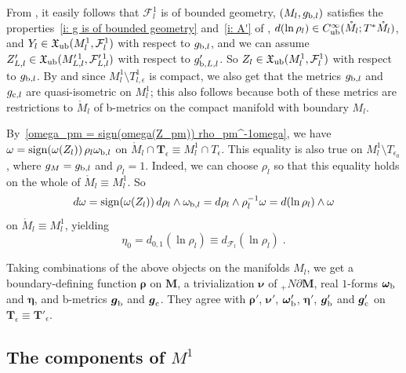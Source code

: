 \documentclass{memo-l}
\theoremstyle{plain}
\theoremstyle{definition}
\theoremstyle{remark}
\newcommand{\FF}{\mathcal{F}}
\newcommand{\fX}{\mathfrak{X}}
\newcommand{\bfg}{\boldsymbol{g}}
\newcommand{\bfM}{\boldsymbol{M}}
\newcommand{\bfT}{\boldsymbol{T}}
\newcommand{\bfnu}{\boldsymbol{\nu}}
\newcommand{\bfrho}{\boldsymbol{\rho}}
\newcommand{\bfeta}{\boldsymbol{\eta}}
\newcommand{\bfomega}{\boldsymbol{\omega}}
\newcommand{\sign}{\operatorname{sign}}
\newcommand{\co}{{\text{\rm c}}}
\newcommand{\fXub}{\fX_{\text{\rm ub}}}
\numberwithin{section}{chapter}
\numberwithin{equation}{section}%
\begin{document}
From , it easily follows that $\FF^1_l$ is of bounded geometry, $(M_l,g_{\text{\rm b},l})$ satisfies the properties~\ref{i: g is of bounded geometry} and~\ref{i: A'} of , $d(\ln\rho_l)\in C^\infty_{\text{\rm ub}}(\mathring M_l;T^*\mathring M_l)$, and $Y_l\in\fXub(M^1_l,\FF^1_l)$ with respect to $g_{\text{\rm b},l}$, and we can assume $Z'_{L,l}\in\fXub(M^{\prime\,1}_{L,l},\FF^{\prime\,1}_{L,l})$ with respect to $g'_{\text{\rm b},L,l}$. So $Z_l\in\fXub(M^1_l,\FF^1_l)$ with respect to $g_{\text{\rm b},l}$. By  and since $M^1_l\setminus T^1_{l,\epsilon}$ is compact, we also get that the metrics $g_{\text{\rm b},l}$ and $g_{\text{\rm c},l}$ are quasi-isometric on $M^1_l$; this also follows because both of these metrics are restrictions to $\mathring M_l$ of b-metrics on the compact manifold with boundary $M_l$.

By~\eqref{omega_pm = sign(omega(Z_pm)) rho_pm^-1omega}, we have $\omega=\sign(\omega(Z_l))\,\rho_l\omega_{\text{\rm b},l}$ on $\mathring M_l\cap\bfT_\epsilon\equiv M^1_l\cap T_\epsilon$. This equality is also true on $M^1_l\setminus T_{\epsilon_0}$, where $g_M=g_{\text{\rm b},l}$ and $\rho_l=1$. Indeed, we can choose $\rho_l$ so that this equality holds on the whole of $\mathring M_l\equiv M^1_l$. So
\[
d\omega=\sign(\omega(Z_l))\,d\rho_l\wedge\omega_{\text{\rm b},l}=d\rho_l\wedge\rho_l^{-1}\omega=d(\ln\rho_l)\wedge\omega
\]
on $\mathring M_l\equiv M^1_l$, yielding
\begin{equation}\label{eta_0 = d_0,1(ln rho_l)}
\eta_0=d_{0,1}(\ln\rho_l)\equiv d_{\FF_l}(\ln\rho_l)\;.
\end{equation}

Taking combinations of the above objects on the manifolds $M_l$, we get a boundary-defining function $\bfrho$ on $\bfM$, a trivialization $\bfnu$ of ${}_+N\partial\bfM$, real $1$-forms $\bfomega_{\text{\rm b}}$ and $\bfeta$, and b-metrics $\bfg_{\text{\rm b}}$ and $\bfg_\co$. They agree with $\bfrho'$, $\bfnu'$, $\bfomega'_{\text{\rm b}}$, $\bfeta'$, $\bfg'_{\text{\rm b}}$ and $\bfg'_\co$ on $\bfT_\epsilon\equiv\bfT'_\epsilon$.



\subsection{The components of $M^1$}\label{ss: components of M^1}
\end{document}
